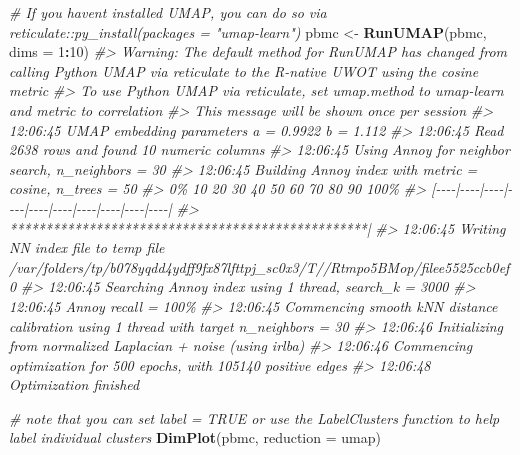 \documentclass[
]{book}
\newenvironment{Shaded}{\begin{snugshade}}{\end{snugshade}}
\newcommand{\AttributeTok}[1]{\textcolor[rgb]{0.13,0.29,0.53}{#1}}
\newcommand{\CommentTok}[1]{\textcolor[rgb]{0.56,0.35,0.01}{\textit{#1}}}
\newcommand{\DecValTok}[1]{\textcolor[rgb]{0.00,0.00,0.81}{#1}}
\newcommand{\FunctionTok}[1]{\textcolor[rgb]{0.13,0.29,0.53}{\textbf{#1}}}
\newcommand{\NormalTok}[1]{#1}
\newcommand{\OtherTok}[1]{\textcolor[rgb]{0.56,0.35,0.01}{#1}}
\newcommand{\SpecialCharTok}[1]{\textcolor[rgb]{0.81,0.36,0.00}{\textbf{#1}}}
\newcommand{\StringTok}[1]{\textcolor[rgb]{0.31,0.60,0.02}{#1}}
\begin{document}
\begin{Shaded}
\begin{Highlighting}[]
\CommentTok{\# If you haven\textquotesingle{}t installed UMAP, you can do so via reticulate::py\_install(packages = "umap{-}learn")}
\NormalTok{pbmc }\OtherTok{\textless{}{-}} \FunctionTok{RunUMAP}\NormalTok{(pbmc, }\AttributeTok{dims =} \DecValTok{1}\SpecialCharTok{:}\DecValTok{10}\NormalTok{)}
\CommentTok{\#\textgreater{} Warning: The default method for RunUMAP has changed from calling Python UMAP via reticulate to the R{-}native UWOT using the cosine metric}
\CommentTok{\#\textgreater{} To use Python UMAP via reticulate, set umap.method to \textquotesingle{}umap{-}learn\textquotesingle{} and metric to \textquotesingle{}correlation\textquotesingle{}}
\CommentTok{\#\textgreater{} This message will be shown once per session}
\CommentTok{\#\textgreater{} 12:06:45 UMAP embedding parameters a = 0.9922 b = 1.112}
\CommentTok{\#\textgreater{} 12:06:45 Read 2638 rows and found 10 numeric columns}
\CommentTok{\#\textgreater{} 12:06:45 Using Annoy for neighbor search, n\_neighbors = 30}
\CommentTok{\#\textgreater{} 12:06:45 Building Annoy index with metric = cosine, n\_trees = 50}
\CommentTok{\#\textgreater{} 0\%   10   20   30   40   50   60   70   80   90   100\%}
\CommentTok{\#\textgreater{} [{-}{-}{-}{-}|{-}{-}{-}{-}|{-}{-}{-}{-}|{-}{-}{-}{-}|{-}{-}{-}{-}|{-}{-}{-}{-}|{-}{-}{-}{-}|{-}{-}{-}{-}|{-}{-}{-}{-}|{-}{-}{-}{-}|}
\CommentTok{\#\textgreater{} **************************************************|}
\CommentTok{\#\textgreater{} 12:06:45 Writing NN index file to temp file /var/folders/tp/b078yqdd4ydff9fx87lfttpj\_sc0x3/T//Rtmpo5BMop/filee5525ccb0ef0}
\CommentTok{\#\textgreater{} 12:06:45 Searching Annoy index using 1 thread, search\_k = 3000}
\CommentTok{\#\textgreater{} 12:06:45 Annoy recall = 100\%}
\CommentTok{\#\textgreater{} 12:06:45 Commencing smooth kNN distance calibration using 1 thread with target n\_neighbors = 30}
\CommentTok{\#\textgreater{} 12:06:46 Initializing from normalized Laplacian + noise (using irlba)}
\CommentTok{\#\textgreater{} 12:06:46 Commencing optimization for 500 epochs, with 105140 positive edges}
\CommentTok{\#\textgreater{} 12:06:48 Optimization finished}
\end{Highlighting}
\end{Shaded}

\begin{Shaded}
\begin{Highlighting}[]
\CommentTok{\# note that you can set \textasciigrave{}label = TRUE\textasciigrave{} or use the LabelClusters function to help label individual clusters}
\FunctionTok{DimPlot}\NormalTok{(pbmc, }\AttributeTok{reduction =} \StringTok{\textquotesingle{}umap\textquotesingle{}}\NormalTok{)}
\end{Highlighting}
\end{Shaded}
\end{document}
